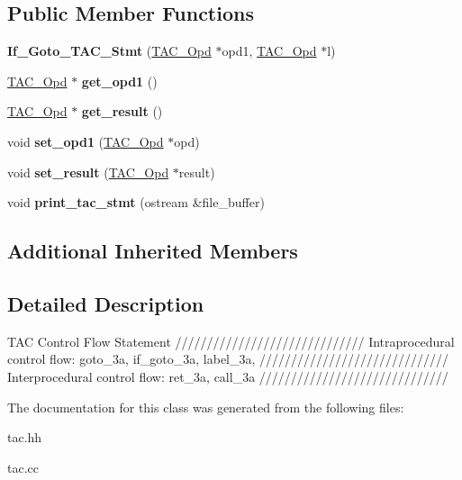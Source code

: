 \subsection*{Public Member Functions}
\begin{DoxyCompactItemize}
\item 
\mbox{\label{classIf__Goto__TAC__Stmt_ae365b561d6e9b768e58349389909c97c}} 
{\bfseries If\+\_\+\+Goto\+\_\+\+T\+A\+C\+\_\+\+Stmt} (\hyperlink{classTAC__Opd}{T\+A\+C\+\_\+\+Opd} $\ast$opd1, \hyperlink{classTAC__Opd}{T\+A\+C\+\_\+\+Opd} $\ast$l)
\item 
\mbox{\label{classIf__Goto__TAC__Stmt_a9bee36f5c916941da93c02d99ac99ed6}} 
\hyperlink{classTAC__Opd}{T\+A\+C\+\_\+\+Opd} $\ast$ {\bfseries get\+\_\+opd1} ()
\item 
\mbox{\label{classIf__Goto__TAC__Stmt_a4494d0d46cc3400da8cbe172293559a5}} 
\hyperlink{classTAC__Opd}{T\+A\+C\+\_\+\+Opd} $\ast$ {\bfseries get\+\_\+result} ()
\item 
\mbox{\label{classIf__Goto__TAC__Stmt_ac8698814cb1f82da52ed5e3549d17359}} 
void {\bfseries set\+\_\+opd1} (\hyperlink{classTAC__Opd}{T\+A\+C\+\_\+\+Opd} $\ast$opd)
\item 
\mbox{\label{classIf__Goto__TAC__Stmt_af5eab646c32b38b9b1e3d1b7c302bec7}} 
void {\bfseries set\+\_\+result} (\hyperlink{classTAC__Opd}{T\+A\+C\+\_\+\+Opd} $\ast$result)
\item 
\mbox{\label{classIf__Goto__TAC__Stmt_a4d3a5e294299d4a2493bc34775ed317c}} 
void {\bfseries print\+\_\+tac\+\_\+stmt} (ostream \&file\+\_\+buffer)
\end{DoxyCompactItemize}
\subsection*{Additional Inherited Members}


\subsection{Detailed Description}
T\+AC Control Flow Statement ////////////////////////////// Intraprocedural control flow\+: goto\+\_\+3a, if\+\_\+goto\+\_\+3a, label\+\_\+3a, ////////////////////////////// Interprocedural control flow\+: ret\+\_\+3a, call\+\_\+3a ////////////////////////////// 

The documentation for this class was generated from the following files\+:\begin{DoxyCompactItemize}
\item 
tac.\+hh\item 
tac.\+cc\end{DoxyCompactItemize}
